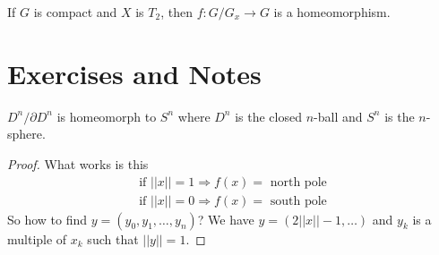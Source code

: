 \begin{thmbox}
    \begin{corollary}
        If \(G\) is compact and \(X\) is \(T_2\), then \(f: G/G_x \longrightarrow G\) is a homeomorphism.
    \end{corollary}
\end{thmbox}

\begin{defbox}
    \begin{definition}
        
    \end{definition}
\end{defbox}

\newpage
\section{Exercises and Notes}

\begin{example}
    \(D^n / \partial D^n\) is homeomorph to \(S^n\) where \(D^n\) is the closed \(n\)-ball and \(S^n\) is the \(n\)-sphere.
\end{example}
\begin{proof}
    What works is this
    \begin{align*}
        \text{if } ||x|| = 1 \Rightarrow f(x) = \text{ north pole} \\
        \text{if } ||x|| = 0 \Rightarrow f(x) = \text{ south pole}
    \end{align*}
    So how to find \(y = (y_0, y_1, \ldots, y_n)\)? We have \(y = (2||x|| - 1, \ldots)\) and \(y_k\) is a multiple of \(x_k\) such that \(||y|| = 1\).
\end{proof}